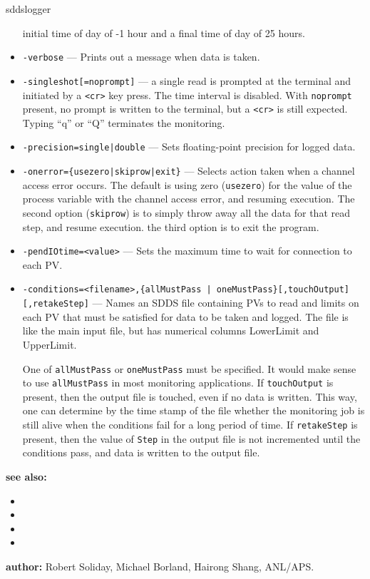 \begin{sddsprog}{sddslogger}
\begin{itemize}
      initial time of day of -1 hour and a final time of day of 25 hours.
  \item {\tt -verbose} --- Prints out a message when data is taken.
  \item {\verb+-singleshot[=noprompt]+} --- a single read is prompted at the terminal
      and initiated by a \verb+<cr>+ key press. The time interval is disabled.
      With \verb+noprompt+ present, no prompt is written to the terminal, but a \verb+<cr>+
      is still expected. Typing ``q'' or ``Q'' terminates the monitoring.
  \item {\tt -precision={single|double}} --- Sets floating-point precision for logged data.
  \item {\tt -onerror=\{usezero|skiprow|exit\}} --- Selects action taken when a channel access error occurs.
      The default is using zero ({\tt usezero}) for the value of the process variable
      with the channel access error, and resuming execution. The second option ({\tt skiprow}) is to
      simply throw away all the data for that read step, and resume execution.
      the third option is to exit the program.
  \item {\tt -pendIOtime=<value>} --- Sets the maximum time to wait for connection to each PV.
  \item {\verb+-conditions=<filename>,{allMustPass | oneMustPass}[,touchOutput][,retakeStep]+} ---
      Names an SDDS file containing PVs to read and limits on each PV that must
      be satisfied for data to be taken and logged.  The file is like the main
      input file, but has numerical columns LowerLimit and UpperLimit.

      One of \verb+allMustPass+ or \verb+oneMustPass+ must be specified. It would make sense
      to use \verb+allMustPass+ in most monitoring applications.
      If \verb+touchOutput+ is present, then the output file is touched, even if no data
      is written. This way, one can determine by the time stamp of the file
      whether the monitoring job is still alive
      when the conditions fail for a long period of time. If \verb+retakeStep+ is
      present, then the value of \verb+Step+ in the output file is not
      incremented until the conditions pass, and data is written to the output file.
\end{itemize}

\item \textbf{see also:}
\begin{itemize}
  \item {}
  \item {}
  \item {}
  \item {}
\end{itemize}
\item \textbf{author:} Robert Soliday, Michael Borland, Hairong Shang, ANL/APS.
\end{sddsprog}

